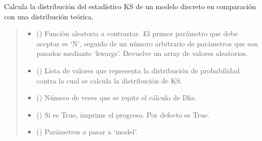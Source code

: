 \documentclass[letterpaper,10pt,english]{sphinxmanual}
\begin{document}
\begin{fulllineitems}
\label{\detokenize{myutils:myutils.stats.Dks_montecarlo_discrete}}
\pysigstartsignatures
{}
\pysigstopsignatures
\sphinxAtStartPar
Calcula la distribución del estadístico KS de un modelo discreto en comparación con una distribución teórica.
\begin{quote}\begin{description}
\begin{itemize}
\item {} 
\sphinxAtStartPar
{} () \textendash{} Función aleatoria a contrastar. El primer parámetro que debe aceptar es ‘N’, seguido de un número arbitrario de
parámetros que son pasados mediante ‘kwargs’. Devuelve un array de valores aleatorios.

\item {} 
\sphinxAtStartPar
{} () \textendash{} Lista de valores que representa la distribución de probabilidad contra la cual se calcula la distribución de KS.

\item {} 
\sphinxAtStartPar
{} () \textendash{} Número de veces que se repite el cálculo de Dks.

\item {} 
\sphinxAtStartPar
{} (\sphinxstyleliteralemphasis{\sphinxupquote{, }}) \textendash{} Si es True, imprime el progreso. Por defecto es True.

\item {} 
\sphinxAtStartPar
{} () \textendash{} Parámetros a pasar a ‘model’.


\end{itemize}
\end{description}
\end{quote}
\end{fulllineitems}
\end{document}
